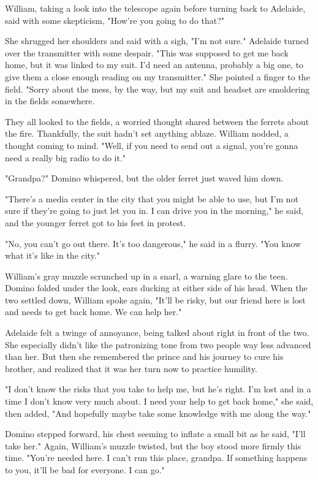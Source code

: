 William, taking a look into the telescope again before turning back to Adelaide, said with some skepticism, "How're you going to do that?"

She shrugged her shoulders and said with a sigh, "I'm not sure." Adelaide turned over the transmitter with some despair. "This was supposed to get me back home, but it was linked to my suit. I'd need an antenna, probably a big one, to give them a close enough reading on my transmitter." She pointed a finger to the field. "Sorry about the mess, by the way, but my suit and headset are smoldering in the fields somewhere.

They all looked to the fields, a worried thought shared between the ferrets about the fire. Thankfully, the suit hadn't set anything ablaze. William nodded, a thought coming to mind. "Well, if you need to send out a signal, you're gonna need a really big radio to do it."

"Grandpa?" Domino whispered, but the older ferret just waved him down.

"There's a media center in the city that you might be able to use, but I'm not sure if they're going to just let you in. I can drive you in the morning," he said, and the younger ferret got to his feet in protest.

"No, you can't go out there. It's too dangerous," he said in a flurry. "You know what it's like in the city."

William's gray muzzle scrunched up in a snarl, a warning glare to the teen. Domino folded under the look, ears ducking at either side of his head. When the two settled down, William spoke again, "It'll be risky, but our friend here is lost and needs to get back home. We can help her."

Adelaide felt a twinge of annoyance, being talked about right in front of the two. She especially didn't like the patronizing tone from two people way less advanced than her. But then she remembered the prince and his journey to cure his brother, and realized that it was her turn now to practice humility.

"I don't know the risks that you take to help me, but he's right. I'm lost and in a time I don't know very much about. I need your help to get back home," she said, then added, "And hopefully maybe take some knowledge with me along the way."

Domino stepped forward, his chest seeming to inflate a small bit as he said, "I'll take her." Again, William's muzzle twisted, but the boy stood more firmly this time. "You're needed here. I can't run this place, grandpa. If something happens to you, it'll be bad for everyone. I can go."


